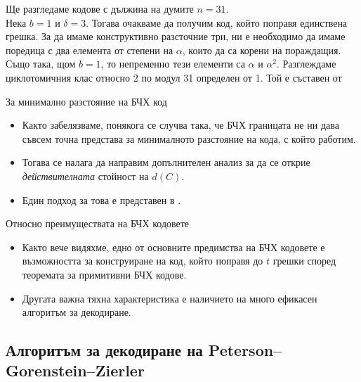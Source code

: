 \documentclass[numbering=fraction]{beamer}
\begin{document}
\begin{frame}
\begin{example}
Ще разгледаме кодове с дължина на думите $n = 31$. \\
\smallskip
Нека $b = 1$ и $\delta = 3$. Тогава очакваме да получим код, който поправя
единствена грешка. За да имаме конструктивно разсточние три, ни е необходимо
да имаме поредица с два елемента от степени на $\alpha$, които да са корени на
пораждащия. Също така, щом $b = 1$, то непременно тези елементи са $\alpha$ и
$\alpha^2$. Разглеждаме циклотомичния клас относно 2 по модул 31 определен от 1.
Той е съставен от 
\end{example}
\end{frame}

\begin{frame}
\begin{example}
\end{example}
\end{frame}

\begin{frame}{За минимално разстояние на БЧХ код}
\begin{itemize}
\item Както забелязваме, понякога се случва така, че БЧХ границата не ни дава
съвсем точна представа за минималното разстояние на кода, с който работим.
\item Тогава се налага да направим допълнителен анализ за да се открие
\emph{действителната} стойност на $d(C)$.
\item Един подход за това е представен в \autocite{lint1986}.
\end{itemize}
\end{frame}

\begin{frame}{Относно преимуществата на БЧХ кодовете}
\begin{itemize}
\item Както вече видяхме, едно от основните предимства на БЧХ кодовете е
възможността за конструиране на код, който поправя до $t$ грешки според
теоремата за примитивни БЧХ кодове.
\item Другата важна тяхна характеристика е наличието на много ефикасен алгоритъм
за декодиране.
\end{itemize}
\end{frame}

\begin{frame}
\section{Алгоритъм за декодиране на Peterson–Gorenstein–Zierler}
\end{frame}
\end{document}
